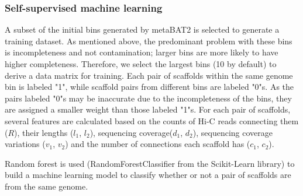 \documentclass[fleqn,10pt,lineno]{wlpeerj}
\begin{document}
\subsubsection*{Self-supervised machine learning}

A subset of the initial bins generated by metaBAT2 is selected to generate a training dataset. As mentioned above, the predominant problem with these bins is incompleteness and not contamination; larger bins are more likely to have higher completeness. Therefore, we select the largest bins (10 by default) to derive a data matrix for training. Each pair of scaffolds within the same genome bin is labeled "1", while scaffold pairs from different bins are labeled "0"s. As the pairs labeled "0"s may be inaccurate due to the incompleteness of the bins, they are assigned a smaller weight than those labeled "1"s.  For each pair of scaffolds, several features are calculated based on the counts of Hi-C reads connecting them ($R$), their lengths ($l_1$, $l_2$), sequencing coverage($d_1$, $d_2$), sequencing coverage variations ($v_1$, $v_2$) and the number of connections each scaffold has ($c_1$, $c_2$). 

Random forest is used (RandomForestClassifier from the Scikit-Learn library) to build a machine learning model to classify whether or not a pair of scaffolds are from the same genome. 
\end{document}
